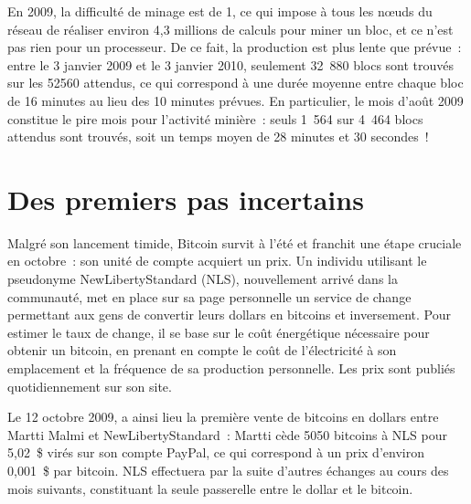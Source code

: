 En 2009, la difficulté de minage est de 1, ce qui impose à tous les nœuds du réseau de réaliser environ 4,3 millions de calculs pour miner un bloc, et ce n'est pas rien pour un processeur. De ce fait, la production est plus lente que prévue~: entre le 3 janvier 2009 et le 3 janvier 2010, seulement 32~880 blocs sont trouvés sur les 52560 attendus, ce qui correspond à une durée moyenne entre chaque bloc de 16 minutes au lieu des 10 minutes prévues. En particulier, le mois d'août 2009 constitue le pire mois pour l'activité minière~: seuls 1~564 sur 4~464 blocs attendus sont trouvés, soit un temps moyen de 28 minutes et 30 secondes~!


\section*{Des premiers pas incertains}

Malgré son lancement timide, Bitcoin survit à l'été et franchit une étape cruciale en octobre~: son unité de compte acquiert un prix. Un individu utilisant le pseudonyme NewLibertyStandard (NLS), nouvellement arrivé dans la communauté, met en place sur sa page personnelle un service de change permettant aux gens de convertir leurs dollars en bitcoins et inversement. Pour estimer le taux de change, il se base sur le coût énergétique nécessaire pour obtenir un bitcoin, en prenant en compte le coût de l'électricité à son emplacement et la fréquence de sa production personnelle. Les prix sont publiés quotidiennement sur son site.

Le 12 octobre 2009, a ainsi lieu la première vente de bitcoins en dollars entre Martti Malmi et NewLibertyStandard~: Martti cède 5050 bitcoins à NLS pour 5,02~\$ virés sur son compte PayPal, ce qui correspond à un prix d'environ 0,001~\$ par bitcoin. NLS effectuera par la suite d'autres échanges au cours des mois suivants, constituant la seule passerelle entre le dollar et le bitcoin. %


